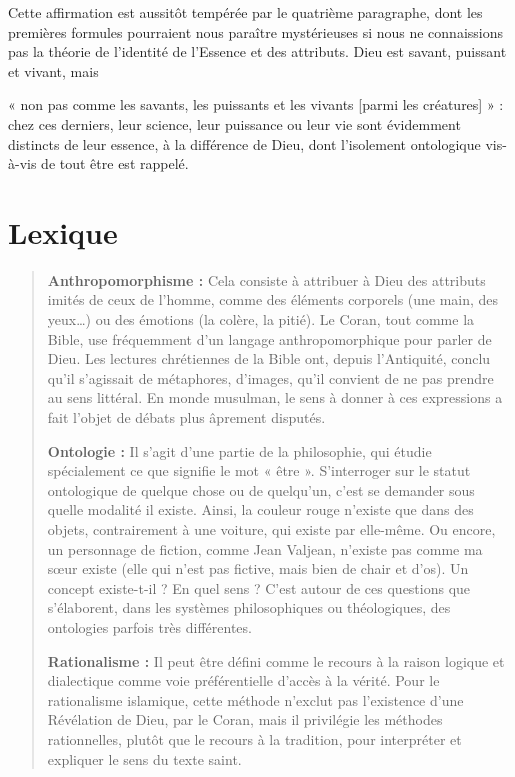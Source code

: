 Cette affirmation est aussitôt tempérée par le quatrième paragraphe,
dont les premières formules pourraient nous paraître mystérieuses si
nous ne connaissions pas la théorie de l'identité de l'Essence et des
attributs. Dieu est savant, puissant et vivant, mais

« non pas comme les savants, les puissants et les vivants {[}parmi les
créatures{]} » : chez ces derniers, leur science, leur puissance ou leur
vie sont évidemment distincts de leur essence, à la différence de Dieu,
dont l'isolement ontologique vis-à-vis de tout être est rappelé.

\section{Lexique}
\begin{quote}
\textbf{Anthropomorphisme :} Cela consiste à attribuer à Dieu des
attributs imités de ceux de l'homme, comme des éléments corporels (une
main, des yeux\ldots) ou des émotions (la colère, la pitié). Le Coran,
tout comme la Bible, use fréquemment d'un langage anthropomorphique pour
parler de Dieu. Les lectures chrétiennes de la Bible ont, depuis
l'Antiquité, conclu qu'il s'agissait de métaphores, d'images, qu'il
convient de ne pas prendre au sens littéral. En monde musulman, le sens
à donner à ces expressions a fait l'objet de débats plus âprement
disputés.

\textbf{Ontologie :} Il s'agit d'une partie de la philosophie, qui
étudie spécialement ce que signifie le mot « être ». S'interroger sur le
statut ontologique de quelque chose ou de quelqu'un, c'est se demander
sous quelle modalité il existe. Ainsi, la couleur rouge n'existe que
dans des objets, contrairement à une voiture, qui existe par elle-même.
Ou encore, un personnage de fiction, comme Jean Valjean, n'existe pas
comme ma sœur existe (elle qui n'est pas fictive, mais bien de chair et
d'os). Un concept existe-t-il ? En quel sens ? C'est autour de ces
questions que s'élaborent, dans les systèmes philosophiques ou
théologiques, des ontologies parfois très différentes.

\textbf{Rationalisme :} Il peut être défini comme le recours à la raison
logique et dialectique comme voie préférentielle d'accès à la vérité.
Pour le rationalisme islamique, cette méthode n'exclut pas l'existence
d'une Révélation de Dieu, par le Coran, mais il privilégie les méthodes
rationnelles, plutôt que le recours à la tradition, pour interpréter et
expliquer le sens du texte saint.


\end{quote}
